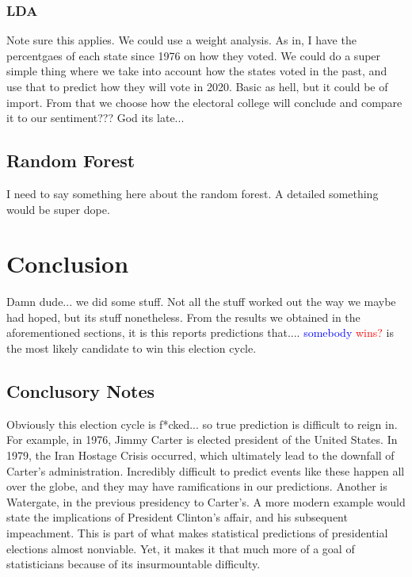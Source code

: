 \documentclass[11pt, oneside]{article}
\begin{document}
\subsubsection{LDA}
Note sure this applies. We could use a weight analysis. As in, I have the percentgaes of each state since 1976 on how they voted. We could do a super simple thing where we take into account how the states voted in the past, and use that to predict how they will vote in 2020. Basic as hell, but it could be of import. From that we choose how the electoral college will conclude and compare it to our sentiment??? God its late...


\subsection{Random Forest}
I need to say something here about the random forest. A detailed something would be super dope.







\section{Conclusion}
Damn dude... we did some stuff. Not all the stuff worked out the way we maybe had hoped, but its stuff nonetheless. From the results we obtained in the aforementioned sections, it is this reports predictions that.... \textcolor{blue}{somebody} \textcolor{red}{wins?} is the most likely candidate to win this election cycle.

\subsection{Conclusory Notes}
Obviously this election cycle is f*cked... so true prediction is difficult to reign in. For example, in 1976, Jimmy Carter is elected president of the United States. In 1979, the Iran Hostage Crisis occurred, which ultimately lead to the downfall of Carter's administration. Incredibly difficult to predict events like these happen all over the globe, and they may have ramifications in our predictions. Another is Watergate, in the previous presidency to Carter's. A more modern example would state the implications of President Clinton's affair, and his subsequent impeachment. This is part of what makes statistical predictions of presidential elections almost nonviable. Yet, it makes it that much more of a goal of statisticians because of its insurmountable difficulty.
\end{document}
